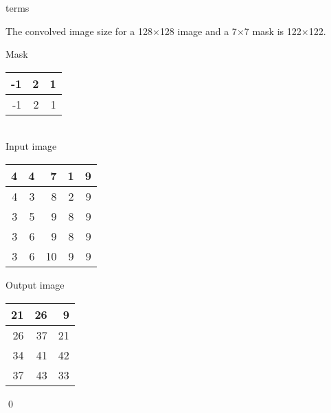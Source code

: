 \documentclass[
        ]{beamer}
\begin{document}
        \begin{frame}[c]{\subsecname terms}
            \begin{overprint}
            \end{overprint}   
        \end{frame}    
        
        \begin{frame}[c]{\subsecname}
            \begin{overprint}
            The convolved image size for a 128$\times$128 image and a 7$\times$7 mask is 122$\times$122.
            \begin{center} 
            Mask\\           
            \begin{tabular}{|r|r|r|}
                     \hline
                    -1 & 2 & 1 \\\hline
                    -1 & 2 & 1 \\\hline
            \end{tabular}\\$\;$\\
            Input image\\           
            \begin{tabular}{|r|r|r|r|r|}
                    \hline
                    4 & 4 & 7  & 1 & 9 \\\hline
                    4 & 3 & 8  & 2 & 9 \\\hline
                    3 & 5 & 9  & 8 & 9 \\\hline
                    3 & 6 & 9  & 8 & 9 \\\hline
                    3 & 6 & 10 & 9 & 9 \\\hline
            \end{tabular}
            \end{center}
            \begin{center} 
            Output image\\           
            \begin{tabular}{|r|r|r|}
                    \hline
                    21 & 26 &  9 \\\hline
                    26 & 37 & 21 \\\hline
                    34 & 41 & 42 \\\hline
                    37 & 43 & 33 \\\hline
            \end{tabular}
            \end{center}\qed
            \end{overprint}
        \end{frame}  
    
\end{document}
